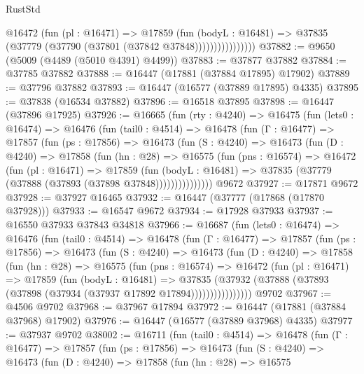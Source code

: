 \begin{lexlean}{RustStd}
\begin{coremodule}
                      @16472
                        (fun (pl : @16471) =>
                        @17859
                          (fun (bodyL : @16481) =>
                          @37835 (@37779 (@37790 (@37801 (@37842 @37848))))))))))))))))
@37882 := @9650 (@5009 (@4489 (@5010 @4391) @4499))
@37883 := @37877 @37882
@37884 := @37785 @37882
@37888 := @16447 (@17881 (@37884 @17895) @17902)
@37889 := @37796 @37882
@37893 := @16447 (@16577 (@37889 @17895) @4335)
@37895 := @37838 (@16534 @37882)
@37896 := @16518 @37895
@37898 := @16447 (@37896 @17925)
@37926 := @16665
    (fun (rty : @4240) =>
    @16475
      (fun (lets0 : @16474) =>
      @16476
        (fun (tail0 : @4514) =>
        @16478
          (fun (Γ : @16477) =>
          @17857
            (fun (ps : @17856) =>
            @16473
              (fun (S : @4240) =>
              @16473
                (fun (D : @4240) =>
                @17858
                  (fun (hn : @28) =>
                  @16575
                    (fun (pns : @16574) =>
                    @16472
                      (fun (pl : @16471) =>
                      @17859
                        (fun (bodyL : @16481) =>
                        @37835 (@37779 (@37888 (@37893 (@37898 @37848)))))))))))))))
    @9672
@37927 := @17871 @9672
@37928 := @37927 @16465
@37932 := @16447 (@37777 (@17868 (@17870 @37928)))
@37933 := @16547 @9672
@37934 := @17928 @37933
@37937 := @16550 @37933 @37843 @34818
@37966 := @16687
    (fun (lets0 : @16474) =>
    @16476
      (fun (tail0 : @4514) =>
      @16478
        (fun (Γ : @16477) =>
        @17857
          (fun (ps : @17856) =>
          @16473
            (fun (S : @4240) =>
            @16473
              (fun (D : @4240) =>
              @17858
                (fun (hn : @28) =>
                @16575
                  (fun (pns : @16574) =>
                  @16472
                    (fun (pl : @16471) =>
                    @17859
                      (fun (bodyL : @16481) =>
                      @37835
                        (@37932
                          (@37888 (@37893 (@37898 (@37934 (@37937 @17892 @17894))))))))))))))))
    @9702
@37967 := @4506 @9702
@37968 := @37967 @17894
@37972 := @16447 (@17881 (@37884 @37968) @17902)
@37976 := @16447 (@16577 (@37889 @37968) @4335)
@37977 := @37937 @9702
@38002 := @16711
    (fun (tail0 : @4514) =>
    @16478
      (fun (Γ : @16477) =>
      @17857
        (fun (ps : @17856) =>
        @16473
          (fun (S : @4240) =>
          @16473
            (fun (D : @4240) =>
            @17858
              (fun (hn : @28) =>
              @16575

\end{coremodule}
\end{lexlean}
